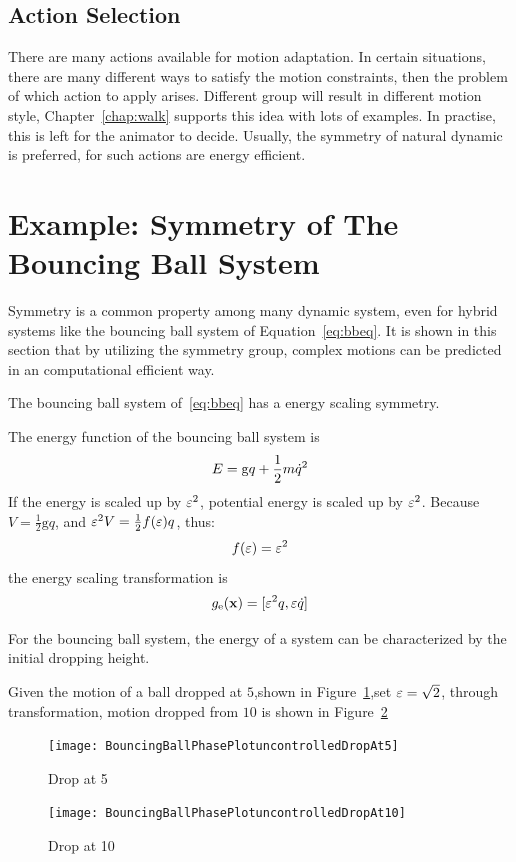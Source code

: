 \subsection{Action Selection}
There are many actions available for motion adaptation.
In certain situations, there are many different ways to satisfy the motion constraints, then the problem of which action to apply arises.
Different group will result in different motion style, Chapter~\ref{chap:walk} supports this idea with lots of examples.
In practise, this is left for the animator to decide.
Usually, the symmetry of natural dynamic is preferred, for such actions are energy efficient.







\section{Example: Symmetry of The Bouncing Ball System}
\label{sec:symball}
Symmetry is a common property among many dynamic system, even for hybrid systems like the bouncing ball system of Equation~\ref{eq:bbeq}.
It is shown in this section that by utilizing the symmetry group, complex motions can be predicted in an computational efficient way.

The bouncing ball system of~\ref{eq:bbeq} has a energy scaling symmetry.

The energy function of the bouncing ball system is  
\[
E=\mathrm{g}q+\frac{1}{2}m\dot{q}^2
\]
If the energy is scaled up by $\varepsilon^2$,  potential energy is scaled up by $\varepsilon^2$.
 Because $V= \frac{1}{2}\mathrm{g}q$, and $\varepsilon^2 V=\frac{1}{2}f(\varepsilon)q$, thus:
\[
f(\varepsilon)=\varepsilon^2
\]
the energy scaling transformation is
\[
g_{\mathrm{e}}(\mathbf{x})=[\varepsilon^2 q, \varepsilon \dot{q}]
\]

For the bouncing ball system, the energy of a system can be characterized by the initial dropping height.

Given the motion of a ball dropped at $5$,shown in Figure~\ref{fig:bouncing5},set $\varepsilon=\sqrt{2}$, through transformation, motion dropped from $10$ is shown in Figure~\ref{fig:bouncing10}
\begin{figure}[!htbp]
  \begin{center}
      \texttt{[image: BouncingBallPhasePlotuncontrolledDropAt5]}
    \caption{Drop at 5}
    \label{fig:bouncing5}
\end{center}
\end{figure}


\begin{figure}[!htbp]
  \begin{center}
      \texttt{[image: BouncingBallPhasePlotuncontrolledDropAt10]}
    \caption{Drop at 10}
    \label{fig:bouncing10}
\end{center}
\end{figure}




